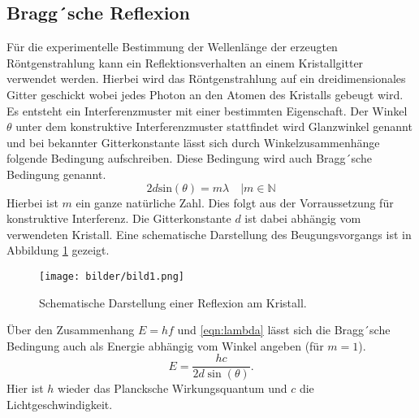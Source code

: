 \subsection{Bragg´sche Reflexion}
Für die experimentelle Bestimmung der Wellenlänge der erzeugten Röntgenstrahlung kann ein Reflektionsverhalten an einem Kristallgitter verwendet werden.
Hierbei wird das Röntgenstrahlung auf ein dreidimensionales Gitter geschickt wobei jedes Photon an den Atomen des Kristalls gebeugt wird. Es entsteht ein Interferenzmuster mit einer bestimmten Eigenschaft.
Der Winkel $\theta$ unter dem konstruktive Interferenzmuster stattfindet wird Glanzwinkel genannt und bei bekannter Gitterkonstante lässt sich durch Winkelzusammenhänge folgende Bedingung aufschreiben.
Diese Bedingung wird auch Bragg´sche Bedingung genannt.
\begin{equation}
\label{eqn:lambda}
2 d \text{sin}(\theta) =  m \lambda \quad | m \in \mathbb{N}
\end{equation}
Hierbei ist $m$ ein ganze natürliche Zahl. Dies folgt aus der Vorraussetzung für konstruktive Interferenz. Die Gitterkonstante $d$ ist dabei abhängig vom verwendeten Kristall.
Eine schematische Darstellung des Beugungsvorgangs ist in Abbildung \ref{fig:bild1} gezeigt.
\\
\begin{figure}[h]
  \centering
  \texttt{[image: bilder/bild1.png]}
  \caption{Schematische Darstellung einer Reflexion am Kristall.}
  \label{fig:bild1}
\end{figure}
Über den Zusammenhang $E = h f$  und \ref{eqn:lambda} lässt sich die Bragg´sche Bedingung auch als Energie abhängig vom Winkel angeben (für $m=1$).
\begin{equation}
    \label{eqn:braggEnergy}
    E = \frac{h c}{2 d \sin (\theta )}.
\end{equation}
Hier ist $h$ wieder das Plancksche Wirkungsquantum und $c$ die Lichtgeschwindigkeit.
